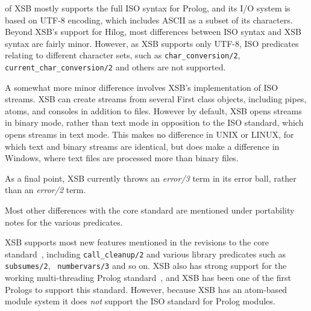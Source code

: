 \version{} of XSB mostly supports the full ISO syntax for Prolog, and
its I/O system is based on UTF-8 encoding, which includes ASCII as a
subset of its characters.  Beyond XSB's support for Hilog, most
differences between ISO syntax and XSB syntax are fairly minor.
However, as XSB supports only UTF-8, ISO predicates relating to
different character sets, such as {\tt char\_conversion/2}, {\tt
  current\_char\_conversion/2} and others are not supported.

A somewhat more minor difference involves XSB's implementation of ISO
streams.  XSB can create streams from several First class objects,
including pipes, atoms, and consoles in addition to files.  However by
default, XSB opens streams in binary mode, rather than text mode in
opposition to the ISO standard, which opens streams in text mode.
This makes no difference in UNIX or LINUX, for which text and binary
streams are identical, but does make a difference in Windows, where
text files are processed more than binary files.

As a final point, XSB currently throws an {\em error/3} term in its
error ball, rather than an {\em error/2} term. 


Most other differences with the core standard are mentioned under
portability notes for the various predicates.  


XSB supports most new features mentioned in the revisions to the core
standard~\cite{ISO-Revision}, including {\tt call\_cleanup/2} and
various library predicates such as {\tt subsumes/2}, {\tt
  numbervars/3} and so on.  XSB also has strong support for the
working multi-threading Prolog standard~\cite{Prolog-MT-ISO}, and XSB
has been one of the first Prologs to support this standard.  However,
because XSB has an atom-based module system it does {\em not} support
the ISO standard for Prolog modules.

